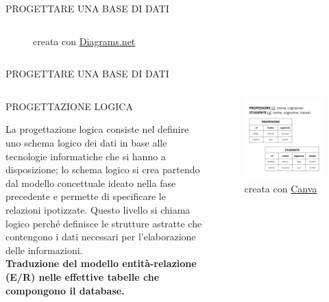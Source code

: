 \documentclass[aspectratio=1610]{beamer}
\begin{document}
\begin{frame}{PROGETTARE UNA BASE DI DATI}
\begin{columns}
\begin{figure}
                \caption{{creata con \href{https://app.diagrams.net/}{Diagrams.net}}}
            \end{figure}
    \end{columns}
\end{frame}

\begin{frame}{PROGETTARE UNA BASE DI DATI}
    \begin{columns}
            \begin{alertblock}{PROGETTAZIONE LOGICA}
                \begin{minipage}{0.98\linewidth}
                    \justifying
                    La progettazione logica consiste nel definire uno schema logico dei dati in
                    base alle tecnologie informatiche che si hanno a disposizione; lo schema
                    logico si crea partendo dal modello concettuale ideato nella fase precedente e
                    permette di specificare le relazioni ipotizzate. Questo livello si chiama logico
                    perché definisce le strutture astratte che contengono i dati necessari per
                    l’elaborazione delle informazioni.\\
                    \textbf{Traduzione del modello entità-relazione (E/R) nelle effettive tabelle che 
                    compongono il database.}
                \end{minipage}
            \end{alertblock}
            \begin{figure}
                \includegraphics[width=\linewidth]{img/esempioLogico.png}
                \caption{{creata con \href{www.canva.com}{Canva}}}
            \end{figure}
    \end{columns}
\end{frame}
\end{document}
